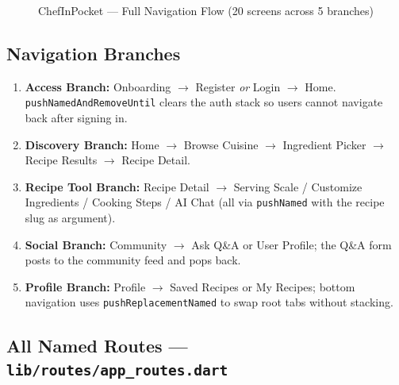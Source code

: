 \documentclass[11pt,a4paper]{article}
\begin{document}
\begin{figure}[H]
\caption{ChefInPocket — Full Navigation Flow (20 screens across 5 branches)}
\end{figure}

\subsection*{Navigation Branches}

\begin{enumerate}
  \item \textbf{Access Branch:} Onboarding $\rightarrow$ Register \emph{or} Login $\rightarrow$ Home.
        \texttt{pushNamedAndRemoveUntil} clears the auth stack so users cannot navigate back after signing in.
  \item \textbf{Discovery Branch:} Home $\rightarrow$ Browse Cuisine $\rightarrow$ Ingredient Picker $\rightarrow$ Recipe Results $\rightarrow$ Recipe Detail.
  \item \textbf{Recipe Tool Branch:} Recipe Detail $\rightarrow$ Serving Scale / Customize Ingredients / Cooking Steps / AI Chat (all via \texttt{pushNamed} with the recipe slug as argument).
  \item \textbf{Social Branch:} Community $\rightarrow$ Ask Q\&A or User Profile; the Q\&A form posts to the community feed and pops back.
  \item \textbf{Profile Branch:} Profile $\rightarrow$ Saved Recipes or My Recipes; bottom navigation uses \texttt{pushReplacementNamed} to swap root tabs without stacking.
\end{enumerate}

\subsection*{All Named Routes — \texttt{lib/routes/app\_routes.dart}}
\end{document}
